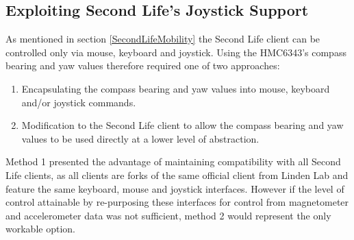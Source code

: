 

\subsection{Exploiting Second Life's Joystick Support}

\label{exploitJoystick}

\newcommand{\ArduinoJoystickVideoFootnote}{\footnote{\url{https://www.youtube.com/watch?v=-ddtmqoGNmg}}}

\newcommand{\atmegaFootnote}{\footnote{\url{http://www.atmel.com/devices/ATMEGA16U2.aspx}}}

\newcommand{\atmegaTFootnote}{\footnote{\url{http://www.atmel.com/devices/atmega328.aspx}}}

\newcommand{\arduinousbhidFootnote}{\footnote{\url{http://hunt.net.nz/users/darran/weblog/a3599/}}}

\newcommand{\lufaFootnote}{\footnote{\url{http://www.fourwalledcubicle.com/LUFA.php}}}


As mentioned in section \ref{SecondLifeMobility} the Second Life client can be controlled only via mouse, keyboard and joystick. Using the HMC6343's compass bearing and yaw values therefore required one of two approaches:

\begin{enumerate}
	\item Encapsulating the compass bearing and yaw values into mouse, keyboard and/or joystick commands.
	\item Modification to the Second Life client to allow the compass bearing and yaw values to be used directly at a lower level of abstraction.
\end{enumerate}

Method 1 presented the advantage of maintaining compatibility with all Second Life clients, as all clients are forks of the same official client from Linden Lab and feature the same keyboard, mouse and joystick interfaces. However if the level of control attainable by re-purposing these interfaces for control from magnetometer and accelerometer data was not sufficient, method 2 would represent the only workable option.

